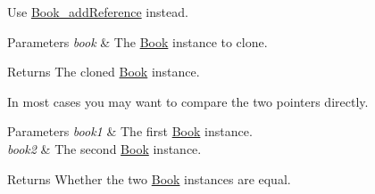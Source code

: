 
\begin{DoxyRefList}
\item[\label{deprecated__deprecated000001}%
\hypertarget{deprecated__deprecated000001}{}%
Global \hyperlink{Book_8h_adb2b1a59b5622e16741f7d8b703279de}{Book\-\_\-clone} (\hyperlink{structBook}{Book} $\ast$book)]Use \hyperlink{Book_8h_ac0c145026ed614f2e951dcf45b0947eb}{Book\-\_\-add\-Reference} instead. 
\begin{DoxyParams}{Parameters}
{\em book} & The \hyperlink{structBook}{Book} instance to clone. \\
\hline
\end{DoxyParams}
\begin{DoxyReturn}{Returns}
The cloned \hyperlink{structBook}{Book} instance.  
\end{DoxyReturn}

\item[\label{deprecated__deprecated000002}%
\hypertarget{deprecated__deprecated000002}{}%
Global \hyperlink{Book_8h_a224d073e77d4f55a30e069acb50a8aec}{Book\-\_\-is\-Equal} (\hyperlink{structBook}{Book} $\ast$book1, \hyperlink{structBook}{Book} $\ast$book2)]In most cases you may want to compare the two pointers directly. 
\begin{DoxyParams}{Parameters}
{\em book1} & The first \hyperlink{structBook}{Book} instance. \\
\hline
{\em book2} & The second \hyperlink{structBook}{Book} instance. \\
\hline
\end{DoxyParams}
\begin{DoxyReturn}{Returns}
Whether the two \hyperlink{structBook}{Book} instances are equal. 
\end{DoxyReturn}

\end{DoxyRefList}